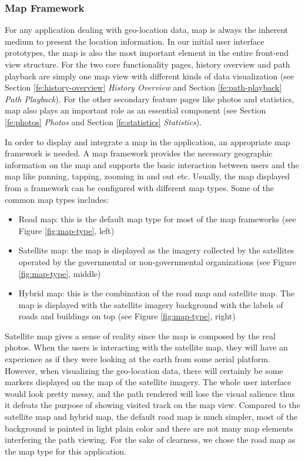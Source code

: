 \documentclass[12pt,a4paper]{article}
\begin{document}
            \subsubsection{Map Framework} %
                \label{fe:map-framework}
                For any application dealing with geo-location data, map is always the inherent medium to present the location information. In our initial user interface prototypes, the map is also the most important element in the entire front-end view structure. For the two core functionality pages, history overview and path playback are simply one map view with different kinds of data visualization (see Section \ref{fe:history-overview} \textit{History Overview} and Section \ref{fe:path-playback} \textit{Path Playback}). For the other secondary feature pages like photos and statistics, map also plays an important role as an essential component (see Section \ref{fe:photos} \textit{Photos} and Section \ref{fe:statistics} \textit{Statistics}).
                
                In order to display and integrate a map in the application, an appropriate map framework is needed. A map framework provides the necessary geographic information on the map and supports the basic interaction between users and the map like panning, tapping, zooming in and out etc. Usually, the map displayed from a framework can be configured with different map types. Some of the common map types includes:
                \begin{itemize}
                    \setlength\itemsep{-0.5em}
                    \item Road map: this is the default map type for most of the map frameworks (see Figure \ref{fig:map-type}, left)
                    \item Satellite map: the map is displayed as the imagery collected by the satellites operated by the governmental or non-governmental organizations (see Figure \ref{fig:map-type}, middle)
                    \item Hybrid map: this is the combination of the road map and satellite map. The map is displayed with the satellite imagery background with the labels of roads and buildings on top (see Figure \ref{fig:map-type}, right)
                \end{itemize}
                
                Satellite map gives a sense of reality since the map is composed by the real photos. When the users is interacting with the satellite map, they will have an experience as if they were looking at the earth from some aerial platform. However, when visualizing the geo-location data, there will certainly be some markers displayed on the map of the satellite imagery. The whole user interface would look pretty messy, and the path rendered will lose the visual salience thus it defeats the purpose of showing visited track on the map view. Compared to the satellite map and hybrid map, the default road map is much simpler, most of the background is painted in light plain color and there are not many map elements interfering the path viewing. For the sake of clearness, we chose the road map as the map type for this application.
                
\end{document}
